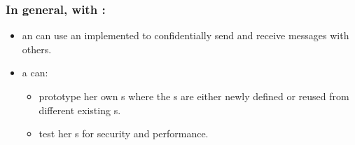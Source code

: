\begin{frame}
\frametitle{In general, with \cry:}
\begin{itemize}
\item an \eu{} can use an implemented \cs{}
  to confidentially send and receive messages with others.
\item a \cg{} can:
  \begin{itemize}
  \item prototype her own \cs s
    where the \ca s are either newly defined
    or reused from different existing \cs s.
  \item test her \cs s for security and performance.
  \end{itemize}
\end{itemize}
\end{frame}
